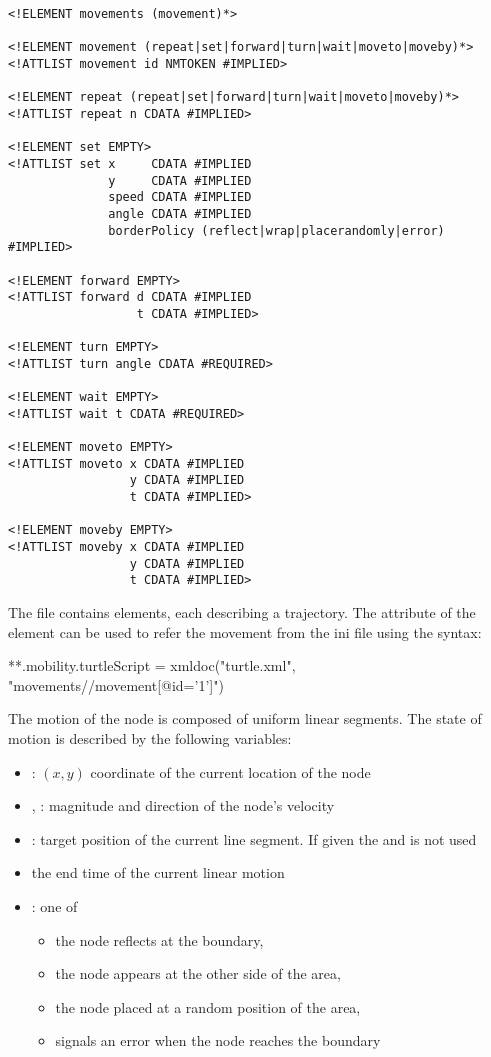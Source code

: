\begin{verbatim}
<!ELEMENT movements (movement)*>

<!ELEMENT movement (repeat|set|forward|turn|wait|moveto|moveby)*>
<!ATTLIST movement id NMTOKEN #IMPLIED>

<!ELEMENT repeat (repeat|set|forward|turn|wait|moveto|moveby)*>
<!ATTLIST repeat n CDATA #IMPLIED>

<!ELEMENT set EMPTY>
<!ATTLIST set x     CDATA #IMPLIED
              y     CDATA #IMPLIED
              speed CDATA #IMPLIED
              angle CDATA #IMPLIED
              borderPolicy (reflect|wrap|placerandomly|error) #IMPLIED>

<!ELEMENT forward EMPTY>
<!ATTLIST forward d CDATA #IMPLIED
                  t CDATA #IMPLIED>

<!ELEMENT turn EMPTY>
<!ATTLIST turn angle CDATA #REQUIRED>

<!ELEMENT wait EMPTY>
<!ATTLIST wait t CDATA #REQUIRED>

<!ELEMENT moveto EMPTY>
<!ATTLIST moveto x CDATA #IMPLIED
                 y CDATA #IMPLIED
                 t CDATA #IMPLIED>

<!ELEMENT moveby EMPTY>
<!ATTLIST moveby x CDATA #IMPLIED
                 y CDATA #IMPLIED
                 t CDATA #IMPLIED>
\end{verbatim}

The file contains  elements, each describing a trajectory.
The  attribute of the  element can be used to
refer the movement from the ini file using the syntax:

\begin{inifile}
**.mobility.turtleScript = xmldoc("turtle.xml", "movements//movement[@id='1']")
\end{inifile}

The motion of the node is composed of uniform linear segments.
The state of motion is described by the following variables:
\begin{itemize}
\item {}: $(x,y)$ coordinate of the current location of the node
\item {}, : magnitude and direction of the node's velocity
\item {}: target position of the current line segment. If given
                       the  and  is not used
\item {} the end time of the current linear motion
\item {}: one of
    \begin{itemize}
      \item {} the node reflects at the boundary,
      \item {} the node appears at the other side of the area,
      \item {} the node placed at a random position of the area,
      \item {} signals an error when the node reaches the boundary
    \end{itemize}
\end{itemize}

